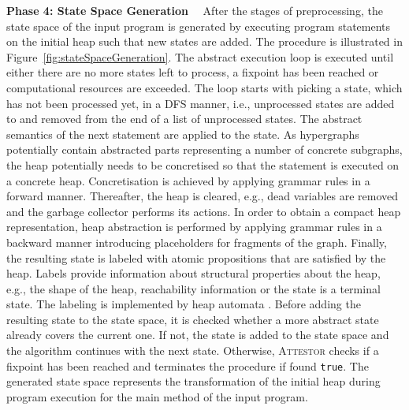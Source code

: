 \documentclass[a4paper, 12pt, twoside]{report}
\begin{document}
	\textbf{Phase 4: State Space Generation$\quad$}	
	After the stages of preprocessing, the state space of the input program is generated by executing program statements on the initial heap such that new states are added. The procedure is illustrated in Figure~\ref{fig:stateSpaceGeneration}. The abstract execution loop is executed until either there are no more states left to process, a fixpoint has been reached or computational resources are exceeded. The loop starts with picking a state, which has not been processed yet, in a DFS manner, i.e., unprocessed states are added to and removed from the end of a list of unprocessed states. The abstract semantics of the next statement are applied to the state. As hypergraphs potentially contain abstracted parts representing a number of concrete subgraphs, the heap potentially needs to be concretised so that the statement is executed on a concrete heap. Concretisation is achieved by applying grammar rules in a forward manner. Thereafter, the heap is cleared, e.g., dead variables are removed and the garbage collector performs its actions. In order to obtain a compact heap representation, heap abstraction is performed by applying grammar rules in a backward manner introducing placeholders for fragments of the graph. Finally, the resulting state is labeled with atomic propositions that are satisfied by the heap. Labels provide information about structural properties about the heap, e.g., the shape of the heap, reachability information or the state is a terminal state. The labeling is implemented by heap automata \cite{arndt2018let}. Before adding the resulting state to the state space, it is checked whether a  more abstract state already covers the current one. If not, the state is added to the state space and the algorithm continues with the next state. Otherwise, \textsc{Attestor} checks if a fixpoint has been reached and terminates the procedure if found \texttt{true}. The generated state space represents the transformation of the initial heap during program execution for the main method of the input program.\\
	
\end{document}
